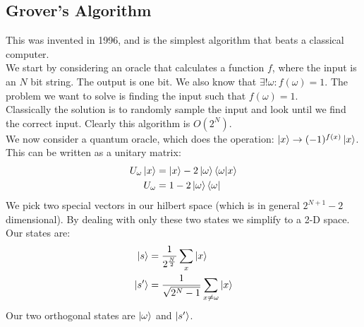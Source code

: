 \subsection{Grover's Algorithm}
This was invented in 1996, and is the simplest algorithm that beats a classical computer.\\
We start by considering an oracle that calculates a function $f$, where the input is an $N$ bit string. The output is one bit. We also know that $\exists! \omega : f(\omega) = 1$. The problem we want to solve is finding the input such that $f(\omega) = 1$. \\
Classically the solution is to randomly sample the input and look until we find the correct input. Clearly this algorithm is $O(2^N)$. \\
We now consider a quantum oracle, which does the operation: $\ket{x} \to (-1)^{f(x)} \ket{x}$. \\
This can be written as a unitary matrix:
\begin{align*}
	U_\omega\ket{x} &= \ket{x} - 2\ket{\omega}\bra{\omega}\ket{x} \\
	U_\omega &= 1 - 2\ket{\omega}\bra{\omega}
\end{align*}
We pick two special vectors in our hilbert space (which is in general $2^{N+1} -2$ dimensional). By dealing with only these two states we simplify to a 2-D space. Our states are:
\begin{align*}
	\ket{s} &= \frac{1}{2^\frac{N}{2}} \sum_x \ket{x} \\
	\ket{s'} &= \frac{1}{\sqrt{2^N-1}} \sum_{x\neq\omega} \ket{x}
\end{align*}
Our two orthogonal states are $\ket{\omega}$ and $\ket{s'}$.
